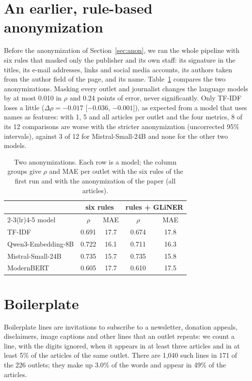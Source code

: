 \documentclass[11pt,a4paper]{article}
\begin{document}
\section{An earlier, rule-based anonymization}\label{app:anon}
Before the anonymization of Section~\ref{sec:anon}, we ran the whole pipeline with six rules that masked only the
publisher and its own staff: its signature in the titles, its e-mail addresses, links and social media accounts, its
authors taken from the author field of the page, and its name. Table~\ref{tab:anon} compares the two anonymizations.
Masking every outlet and journalist changes the language models by at most 0.010 in $\rho$ and 0.24 points of error,
never significantly. Only TF-IDF loses a little ($\Delta\rho = -0.017$ [$-0.036$, $-0.001$]), as expected from a model
that uses names as features: with 1, 5 and all articles per outlet and the four metrics, 8 of its 12 comparisons are
worse with the stricter anonymization (uncorrected 95\% intervals), against 3 of 12 for Mistral-Small-24B and none for
the other two models.

\begin{table}[h]
\centering
\caption{Two anonymizations. Each row is a model; the column groups give $\rho$ and MAE per outlet with the six rules of
the first run and with the anonymization of the paper (all articles).}\label{tab:anon}
\begin{tabular}{lcccc}
\toprule
& \multicolumn{2}{c}{six rules} & \multicolumn{2}{c}{rules + GLiNER} \\
\cmidrule(lr){2-3}\cmidrule(lr){4-5}
model & $\rho$ & MAE & $\rho$ & MAE \\
\midrule
TF-IDF & 0.691 & 17.7 & 0.674 & 17.8 \\
Qwen3-Embedding-8B & 0.722 & 16.1 & 0.711 & 16.3 \\
Mistral-Small-24B & 0.735 & 15.7 & 0.735 & 15.8 \\
ModernBERT & 0.605 & 17.7 & 0.610 & 17.5 \\
\bottomrule
\end{tabular}
\end{table}

\section{Boilerplate}\label{app:reading}
Boilerplate lines are invitations to subscribe to a newsletter, donation appeals, disclaimers, image captions and other
lines that an outlet repeats: we count a line, with the digits ignored, when it appears in at least three articles and
in at least 5\% of the articles of the same outlet. There are 1,040 such lines in 171 of the 226 outlets; they make up
3.0\% of the words and appear in 49\% of the articles.
\end{document}
